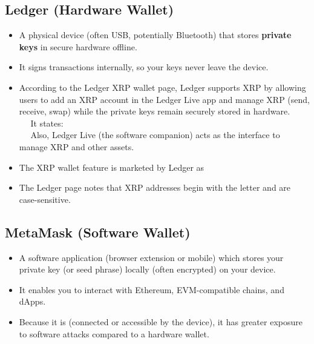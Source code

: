 \documentclass{article}
\begin{document}
\subsection*{Ledger (Hardware Wallet)}
\begin{itemize}
  \item A physical device (often USB, potentially Bluetooth) that stores \textbf{private keys} in secure hardware offline.  
  \item It signs transactions internally, so your keys never leave the device.  
  \item According to the Ledger XRP wallet page, Ledger supports XRP by allowing users to 
  add an XRP account in the Ledger Live app and manage XRP (send, receive, swap) 
  while the private keys remain securely stored in hardware. \\
  \(\quad\) It states: \\
  \(\quad\) Also, Ledger Live (the software companion) acts as the interface to manage XRP and other assets.
  \item The XRP wallet feature is marketed by Ledger as 
  \item The Ledger page notes that XRP addresses begin with the letter  and are case-sensitive.
\end{itemize}

\subsection*{MetaMask (Software Wallet)}
\begin{itemize}
  \item A software application (browser extension or mobile) which stores your private key (or seed phrase) locally (often encrypted) on your device.  
  \item It enables you to interact with Ethereum, EVM-compatible chains, and dApps.  
  \item Because it is  (connected or accessible by the device), it has greater exposure to software attacks compared to a hardware wallet.  
\end{itemize}
\end{document}
